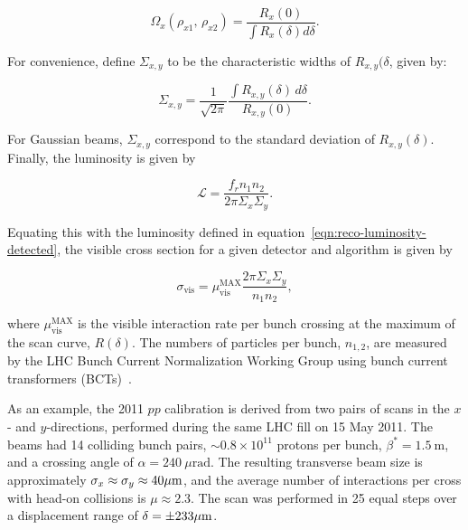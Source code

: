\begin{equation}
	\Omega_x (\rho_{x1},\,\rho_{x2}) = \frac{R_x(0)}{\int R_x(\delta) d\delta}.
\end{equation}

For convenience, define $\Sigma_{x,y}$ to be the characteristic widths of $R_{x,y}(\delta$, given by:

\begin{equation}\label{eqn:reco-luminosity-CapSigma}
	\Sigma_{x,y}=\frac{1}{\sqrt{2\pi}} \frac{\int R_{x,y}(\delta)\,d\delta}{R_{x,y}(0)}.
\end{equation}

For Gaussian beams, $\Sigma_{x,y}$ correspond to the standard deviation of $R_{x,y}(\delta)$. Finally, the luminosity is given by

\begin{equation}
	\mathcal{L} = \frac{f_r n_1 n_2}{2\pi \Sigma_x \Sigma_y}.
\end{equation}

Equating this with the luminosity defined in equation~\ref{eqn:reco-luminosity-detected}, the visible cross section for a given detector and algorithm is given by

\begin{equation}
	\sigma_{\mathrm{vis}} = \mu_{\mathrm{vis}}^{\mathrm{MAX}} \frac{2\pi \Sigma_x \Sigma_y}{n_1 n_2},
\end{equation}

where $\mu_{\mathrm{vis}}^{\mathrm{MAX}}$ is the visible interaction rate per bunch crossing at the maximum of the scan curve, $R(\delta)$. The numbers of particles per bunch, $n_{1,2}$, are measured by the LHC Bunch Current Normalization Working Group using bunch current transformers (BCTs)~\cite{BCNWG}. 

As an example, the 2011 $pp$ calibration is derived from two pairs of scans in the $x$- and $y$-directions, performed during the same LHC fill on 15 May 2011. The beams had 14 colliding bunch pairs, $\sim0.8\times 10^11$ protons per bunch, $\beta^*=1.5~\mbox{m}$, and a crossing angle of $\alpha=240~\mu\mbox{rad}$. The resulting transverse beam size is approximately $\sigma_{x}\approx\sigma_{y}\approx 40 \mu\mathrm{m}$, and the average number of interactions per cross with head-on collisions is $\mu\approx 2.3$. The scan was performed in 25 equal steps over a displacement range of $\delta=\pm 233 \mu\mathrm{m}$.

